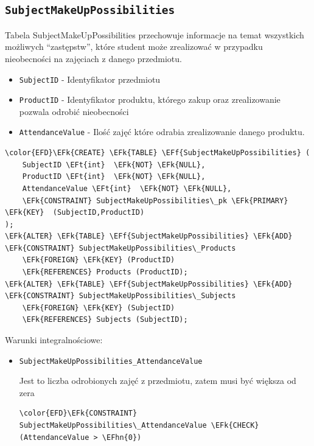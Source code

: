\documentclass[11pt]{article}
\newcommand{\EFk}[1]{\textcolor{EFk}{\textbf{#1}}} %
\newcommand{\EFf}[1]{\textcolor{EFf}{#1}} %
\newcommand{\EFt}[1]{\textcolor{EFt}{\textbf{#1}}} %
\newcommand{\EFhn}[1]{\textcolor{EFhn}{#1}} %
\begin{document}
\subsection{\texttt{SubjectMakeUpPossibilities}}
\label{sec:org5851cba}
Tabela SubjectMakeUpPossibilities przechowuje informacje na temat wszystkich możliwych ``zastępstw'', które student może zrealizować w przypadku nieobecności na zajęciach z danego przedmiotu.
\begin{itemize}
\item \texttt{SubjectID} - Identyfikator przedmiotu
\item \texttt{ProductID} - Identyfikator produktu, którego zakup oraz zrealizowanie pozwala odrobić nieobecności
\item \texttt{AttendanceValue} - Ilość zajęć które odrabia zrealizowanie danego produktu.
\end{itemize}
\begin{Code}
\begin{Verbatim}
\color{EFD}\EFk{CREATE} \EFk{TABLE} \EFf{SubjectMakeUpPossibilities} (
    SubjectID \EFt{int}  \EFk{NOT} \EFk{NULL},
    ProductID \EFt{int}  \EFk{NOT} \EFk{NULL},
    AttendanceValue \EFt{int}  \EFk{NOT} \EFk{NULL},
    \EFk{CONSTRAINT} SubjectMakeUpPossibilities\_pk \EFk{PRIMARY} \EFk{KEY}  (SubjectID,ProductID)
);
\EFk{ALTER} \EFk{TABLE} \EFf{SubjectMakeUpPossibilities} \EFk{ADD} \EFk{CONSTRAINT} SubjectMakeUpPossibilities\_Products
    \EFk{FOREIGN} \EFk{KEY} (ProductID)
    \EFk{REFERENCES} Products (ProductID);
\EFk{ALTER} \EFk{TABLE} \EFf{SubjectMakeUpPossibilities} \EFk{ADD} \EFk{CONSTRAINT} SubjectMakeUpPossibilities\_Subjects
    \EFk{FOREIGN} \EFk{KEY} (SubjectID)
    \EFk{REFERENCES} Subjects (SubjectID);
\end{Verbatim}
\end{Code}
Warunki integralnościowe:


\begin{itemize}
\item \texttt{SubjectMakeUpPossibilities\_AttendanceValue}

Jest to liczba odrobionych zajęć z przedmiotu, zatem musi być większa od zera
\begin{Code}
\begin{Verbatim}
\color{EFD}\EFk{CONSTRAINT} SubjectMakeUpPossibilities\_AttendanceValue \EFk{CHECK}
(AttendanceValue > \EFhn{0})
\end{Verbatim}
\end{Code}
\end{itemize}
\end{document}
